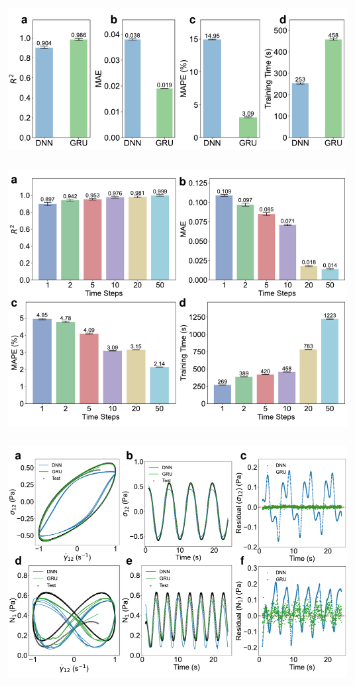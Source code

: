 \begin{figure}[htbp]
	\centering
	\includegraphics[width=0.8\textwidth]{Fig/Maxwell_sin_metric.pdf}
\end{figure}
\begin{figure}[htbp]
	\centering
	\includegraphics[width=0.8\textwidth]{Fig/Maxwell_timesteps_metrics.pdf}
\end{figure}

\begin{figure}[htbp]
	\centering
	\includegraphics[width=0.8\textwidth]{Fig/giesekus_sin.pdf}
\end{figure}

